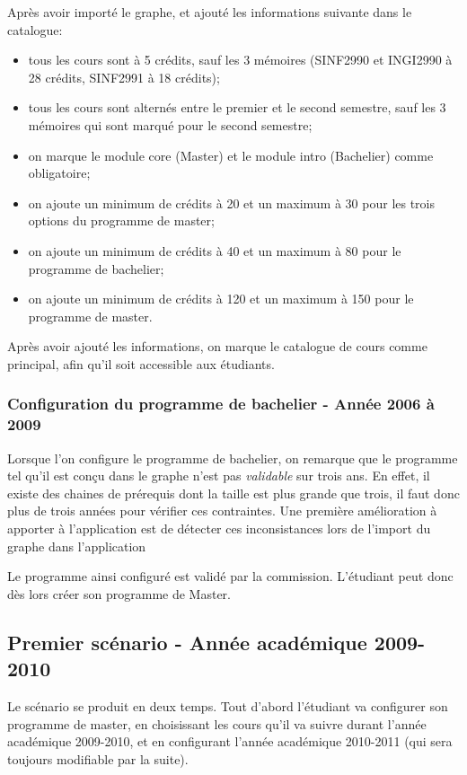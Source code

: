 Après avoir importé le graphe, et ajouté les informations suivante dans le catalogue:
\begin{itemize}
\item tous les cours sont à 5 crédits, sauf les 3 mémoires (SINF2990 et INGI2990 à 28 crédits, SINF2991 à 18 crédits);
\item tous les cours sont alternés entre le premier et le second semestre, sauf les 3 mémoires qui sont marqué pour le second semestre;
\item on marque le module core (Master) et le module intro (Bachelier) comme obligatoire;
\item on ajoute un minimum de crédits à 20 et un maximum à 30 pour les trois options du programme de master;
\item on ajoute un minimum de crédits à 40 et un maximum à 80 pour le programme de bachelier;
\item on ajoute un minimum de crédits à 120 et un maximum à 150 pour le programme de master.
\end{itemize}   

Après avoir ajouté les informations, on marque le catalogue de cours comme principal, afin qu'il soit accessible aux étudiants.


\subsubsection{Configuration du programme de bachelier - Année 2006 à 2009}
Lorsque l'on configure le programme de bachelier, on remarque que le programme tel qu'il est conçu dans le graphe n'est pas \textit{validable} sur trois ans. En effet, il existe des chaines de prérequis dont la taille est plus grande que trois, il faut donc plus de trois années pour vérifier ces contraintes. Une première amélioration à apporter à l'application est de détecter ces inconsistances lors de l'import du graphe dans l'application

Le programme ainsi configuré est validé par la commission. L'étudiant peut donc dès lors créer son programme de Master. 
\subsection{Premier scénario - Année académique 2009-2010}
Le scénario se produit en deux temps. Tout d'abord l'étudiant va configurer son programme de master, en choisissant les cours qu'il va suivre durant l'année académique 2009-2010, et en configurant l'année académique 2010-2011 (qui sera toujours modifiable par la suite).

